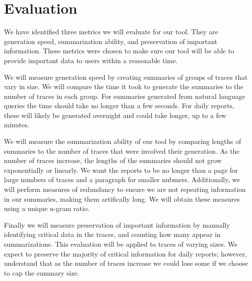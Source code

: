 \section{Evaluation}

We have identified three metrics we will evaluate for our tool. They are generation speed, summarization ability,
and preservation of important information. These metrics were chosen to make sure our tool will be able to provide 
important data to users within a reasonable time. 

We will measure generation speed by creating summaries of groups of traces that vary in size. We will compare the time it took 
to generate the summaries to the number of traces in each group. For summaries generated from natural language queries the time
should take no longer than a few seconds. For daily reports, these will likely be generated overnight and could take longer, 
up to a few minutes. 

We will measure the summarization ability of our tool by comparing lengths of summaries to the number of traces that were involved
their generation. As the number of traces increase, the lengths of the summaries should not grow exponentially or linearly. We want the 
reports to be no longer than a page for large numbers of traces and a paragraph for smaller nubmers. Additionally, we will perform measures 
of redundancy to ensure we are not repeating information in our summaries, making them artifically long. We will obtain these measures using
a unique n-gram ratio.

Finally we will measure preservation of important information by manually identifying critical data in the traces, and counting how many
appear in summarizations. This evaluation will be applied to traces of varying sizes. We expect to preserve the majority of critical 
information for daily reports; however, understand that as the number of traces increase we could lose some if we choose to cap the 
summary size. 